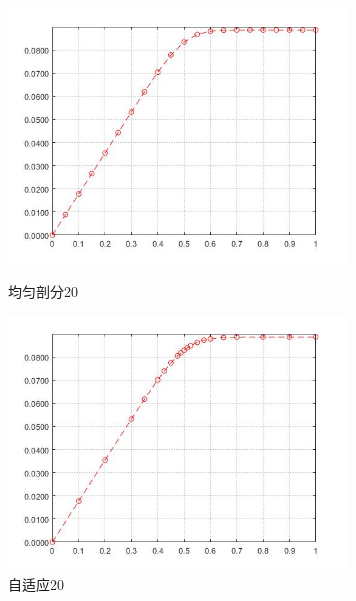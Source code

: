 \documentclass[12pt,fontset=mac]{ctexart}
\begin{document}
\begin{figure}[H]
	\centering
	\begin{minipage}[t]{0.48\textwidth}
		\centering
		\includegraphics[width=9cm]{方程一，均匀剖分20.jpg}
		\caption{均匀剖分20}
	\end{minipage}
	\begin{minipage}[t]{0.48\textwidth}
		\centering
		\includegraphics[width=9cm]{方程一，自适应20.jpg}
		\caption{自适应20}
	\end{minipage}
\end{figure}
\end{document}
